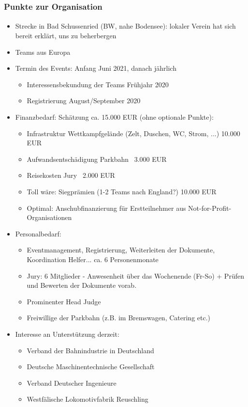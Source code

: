 \documentclass[slidestop,compress,mathserif, aspectratio = 169]{beamer}
\begin{document}
{\begin{frame}[allowframebreaks]
\frametitle{Punkte zur Organisation}
\framesubtitle{}
\begin{itemize}
\item Strecke in Bad Schussenried (BW, nahe Bodensee): lokaler Verein hat sich bereit erklärt, uns zu beherbergen
\item Teams aus Europa
\item Termin des Events: Anfang Juni 2021, danach jährlich
\begin{itemize}
		\item Interessensbekundung der Teams Frühjahr 2020
		\item Registrierung August/September 2020
		\end{itemize} 
\item Finanzbedarf: Schätzung ca. 15.000 EUR (ohne optionale Punkte):
\begin{itemize}
		\item Infrastruktur Wettkampfgelände (Zelt, Duschen, WC, Strom, ...) 10.000 EUR
    		\item Aufwandsentschädigung Parkbahn ~3.000 EUR
   		\item  Reisekosten Jury ~2.000 EUR
    		\item Toll wäre: Siegprämien (1-2 Teams nach England?) 10.000 EUR
    		\item Optimal: Anschubfinanzierung für Erstteilnehmer aus Not-for-Profit-Organisationen		
		\end{itemize}\framebreak
\item Personalbedarf:
	\begin{itemize}
		\item Eventmanagement, Registrierung, Weiterleiten der Dokumente, Koordination Helfer... ca. 6 Personenmonate
    		\item Jury: 6 Mitglieder - Anwesenheit über das Wochenende (Fr-So) + Prüfen und Bewerten der Dokumente vorab. 	
		\item Prominenter Head Judge
    		\item Freiwillige der Parkbahn (z.B. im Bremswagen, Catering etc.)
		\end{itemize}
\item Interesse an Unterst\"utzung derzeit:
\begin{itemize}
		\item Verband der Bahnindustrie in Deutschland
		\item Deutsche Maschinentechnische Gesellschaft
		\item Verband Deutscher Ingenieure
		\item Westf\"alische Lokomotivfabrik Reuschling 
		\end{itemize}
		\end{itemize}
\end{frame}

}
\end{document}

